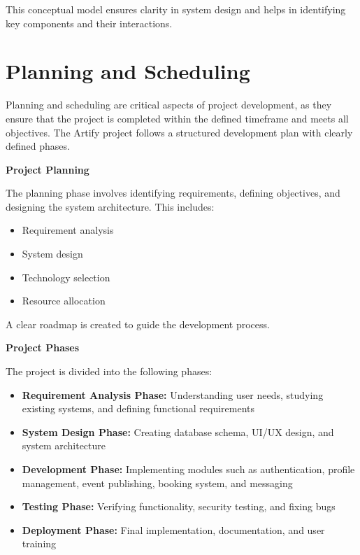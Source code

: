 \documentclass[12pt,a4paper]{report}
\begin{document}
This conceptual model ensures clarity in system design and helps in identifying key components and their interactions.

\section{Planning and Scheduling}
Planning and scheduling are critical aspects of project development, as they ensure that the project is completed within the defined timeframe and meets all objectives. The Artify project follows a structured development plan with clearly defined phases.

\textbf{Project Planning}

The planning phase involves identifying requirements, defining objectives, and designing the system architecture. This includes:

\begin{itemize}
\item Requirement analysis

\item System design

\item Technology selection

\item Resource allocation
\end{itemize}

A clear roadmap is created to guide the development process.

\textbf{Project Phases}

The project is divided into the following phases:

\begin{itemize}
\item \textbf{Requirement Analysis Phase:} Understanding user needs, studying existing systems, and defining functional requirements

\item \textbf{System Design Phase:} Creating database schema, UI/UX design, and system architecture

\item \textbf{Development Phase:} Implementing modules such as authentication, profile management, event publishing, booking system, and messaging

\item \textbf{Testing Phase:} Verifying functionality, security testing, and fixing bugs

\item \textbf{Deployment Phase:} Final implementation, documentation, and user training
\end{itemize}
\end{document}
